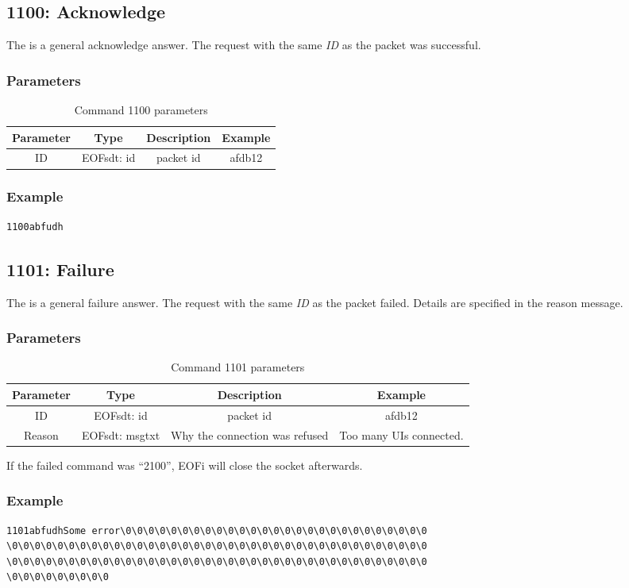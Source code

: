 \documentclass[12pt,a4paper]{book}
\begin{document}
\subsection{1100: Acknowledge}
The is a general acknowledge answer. The request with the
same \emph{ID} as the packet was successful.
\subsubsection{Parameters}
\begin{longtable}{|c|c|c|c|}
\caption{Command 1100 parameters}\\
\hline
\textbf{Parameter} & \textbf{Type} & \textbf{Description} & \textbf{Example}\\
\hline
ID & EOFsdt: id & packet id & afdb12\\
\hline
\end{longtable}
\subsubsection{Example}
\begin{verbatim}
1100abfudh
\end{verbatim}
\subsection{1101: Failure}
The is a general failure answer. The request with the
same \emph{ID} as the packet failed.
Details are specified in the reason message.
\subsubsection{Parameters}
\begin{longtable}{|c|c|c|c|}
\caption{Command 1101 parameters}\\
\hline
\textbf{Parameter} & \textbf{Type} & \textbf{Description} & \textbf{Example}\\
\hline
ID & EOFsdt: id & packet id & afdb12\\
\hline
Reason & EOFsdt: msgtxt & Why the connection was refused & Too many UIs connected.\\
\hline
\end{longtable}
If the failed command was "`2100"', EOFi will close the socket afterwards.
\subsubsection{Example}
\begin{verbatim}
1101abfudhSome error\0\0\0\0\0\0\0\0\0\0\0\0\0\0\0\0\0\0\0\0\0\0\0\0\0\0\0
\0\0\0\0\0\0\0\0\0\0\0\0\0\0\0\0\0\0\0\0\0\0\0\0\0\0\0\0\0\0\0\0\0\0\0\0\0
\0\0\0\0\0\0\0\0\0\0\0\0\0\0\0\0\0\0\0\0\0\0\0\0\0\0\0\0\0\0\0\0\0\0\0\0\0
\0\0\0\0\0\0\0\0\0
\end{verbatim}
\end{document}
